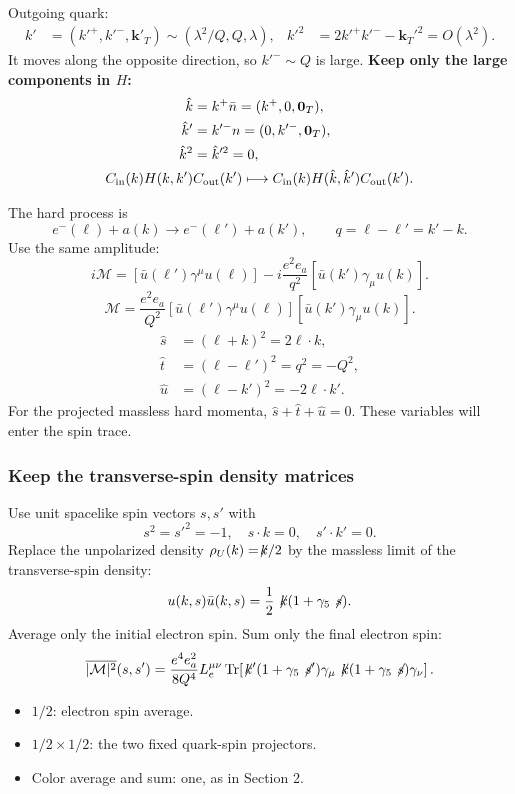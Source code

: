 \documentclass[14pt,a4paper]{extarticle}
\numberwithin{equation}{section}
\newcommand{\M}{\mathcal M}
\newcommand{\slsh}[1]{\not\!#1}
\begin{document}
Outgoing quark:
\begin{align}
k'&=(k'^+,k'^-,\bm k'_T)
   \sim(\lambda^2/Q,Q,\lambda),&
k'^2&=2k'^+k'^- -\bm k_T'^2=O(\lambda^2).
\end{align}
It moves along the opposite direction, so $k'^-\sim Q$ is large.
\textbf{Keep only the large components in $H$:}
\begin{align}
 \hat k&=k^+\bar n=(k^+,0,\bm0_T),\\
 \hat k'&=k'^-n=(0,k'^-,\bm0_T),\\
 \hat k^2&=\hat k'^2=0,\\
 C_{\rm in}(k)H(k,k')&C_{\rm out}(k')
\longmapsto C_{\rm in}(k)H(\hat k,\hat k')C_{\rm out}(k').
\end{align}

The hard process is
\begin{equation}
 e^-(\ell)+a(k)\longrightarrow e^-(\ell')+a(k'),\qquad
 q=\ell-\ell'=k'-k.
\end{equation}
Use the same amplitude:
\begin{equation}
  i\M=[\bar u(\ell')\gamma^\mu u(\ell)]-i\frac{e^2e_a}{q^2}[\bar u(k')\gamma_\mu u(k)].
\end{equation}
\begin{equation}
 \M=\frac{e^2e_a}{Q^2}
 [\bar u(\ell')\gamma^\mu u(\ell)]
 [\bar u(k')\gamma_\mu u(k)].
\end{equation}
\begin{align}
 \hat s&=(\ell+k)^2=2\ell\cdot k,\\
 \hat t&=(\ell-\ell')^2=q^2=-Q^2,\\
 \hat u&=(\ell-k')^2=-2\ell\cdot k'.
\end{align}
For the projected massless hard momenta,
$\hat s+\hat t+\hat u=0$. These variables will enter the spin trace.


\subsubsection{Keep the transverse-spin density matrices}


Use unit spacelike spin vectors $s,s'$ with
\begin{equation}
 s^2=s'^2=-1,\quad s\cdot k=0,\quad s'\cdot k'=0.
\end{equation}
Replace the unpolarized density $\rho_U(k)=\slsh k/2$ by
the massless limit of the transverse-spin density:
\begin{equation}
 u(k,s)\bar u(k,s)=\frac12\slsh k(1+\gamma_5\slsh s).
\end{equation}
Average only the initial electron spin. Sum only the final electron spin:
\begin{equation}
 \overline{|\M|^2}(s,s')
 =\frac{e^4e_a^2}{8Q^4}L_e^{\mu\nu}
 \operatorname{Tr}\!\left[
 \slsh{k'}(1+\gamma_5\slsh{s'})\gamma_\mu
 \slsh k(1+\gamma_5\slsh s)\gamma_\nu\right].
\end{equation}
\begin{itemize}
 \item $1/2$: electron spin average.
 \item $1/2\times1/2$: the two fixed quark-spin projectors.
 \item Color average and sum: one, as in Section 2.
\end{itemize}
\end{document}
